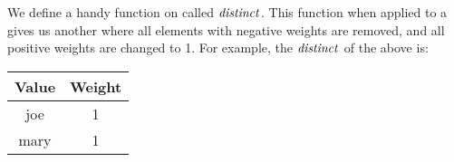 
%
%


We define a handy function on \zrs called $\mathit{distinct}$.  This function
when applied to a \zr gives us another \zr where all elements with
negative weights are removed, and all positive weights are changed to
1.  For example, the $\mathit{distinct}$ of the above \zr is:

\begin{center}
\begin{tabular}{|c|c|}\hline
  Value & Weight \\ \hline
  joe & 1 \\
  mary & 1 \\ \hline
\end{tabular}
\end{center}


